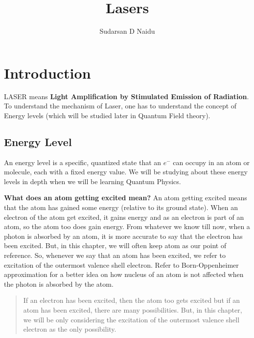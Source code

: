 \documentclass[12pt]{article}
\begin{document}
\fontsize{14}{16}
\selectfont
\captionsetup[figure]{font=normal}

\title{Lasers}
\author{Sudarsan D Naidu}
\maketitle

\tableofcontents

\section{Introduction}

LASER means \textbf{Light Amplification by Stimulated Emission of Radiation}. To understand the mechanism of Laser, one has to understand the concept of Energy levels (which will be studied later in Quantum Field theory).

\subsection{Energy Level}

An energy level is a specific, quantized state that an $e^{-}$ can occupy in an atom or molecule, each with a fixed energy value. We will be studying about these energy levels in depth when we will be learning Quantum Physics. \vspace{.2cm}

\textbf{What does an atom getting excited mean?} An atom getting excited means that the atom has gained some energy (relative to its ground state). When an electron of the atom get excited, it gains energy and as an electron is part of an atom, so the atom too does gain energy. From whatever we know till now, when a photon is absorbed by an atom, it is more accurate to say that the electron has been excited. But, in this chapter, we will often keep atom as our point of reference. So, whenever we say that an atom has been excited, we refer to excitation of the outermost valence shell electron. Refer to Born-Oppenheimer approximation for a better idea on how nucleus of an atom is not affected when the photon is absorbed by the atom.

\begin{quote}
    If an electron has been excited, then the atom too gets excited but if an atom has been excited, there are many possibilities. But, in this chapter, we will be only considering the excitation of the outermost valence shell electron as the only possibility.
\end{quote}
\end{document}
